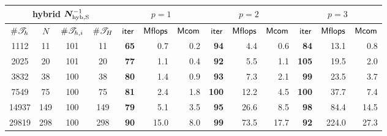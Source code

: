  {\footnotesize
      \tabcolsep 4pt
  \begin{tabular}{cccc|rrr|rrr|rrr}
  \hline
  \multicolumn{4}{c|}{{\small\bf hybrid} $\bm{N}_{\mathrm{hyb,S}}^{-1}$        }  &  \multicolumn{3}{c|}{$p=1$} & \multicolumn{3}{c|}{$p=2$}&   \multicolumn{3}{c}{$p=3$}\\
  \hline
     $ \# {{\mathscr T}_h} $   &
     $ N $ & $ \# {{\mathscr T}_{h,i}} $   &
     $ \# {{\mathscr T}_H} $ & 
     $ \mathsf{iter} $ & $ \mathsf{Mflops} $ & $ \mathsf{Mcom} $ & 
     $ \mathsf{iter} $ & $ \mathsf{Mflops} $ & $ \mathsf{Mcom} $ & 
     $ \mathsf{iter} $ & $ \mathsf{Mflops} $ & $ \mathsf{Mcom} $ \\ 
  \hline
    1112 &       11 &      101 &       11
& {\bf       65}  &        0.7 &        0.2
& {\bf       94}  &        4.4 &        0.6
& {\bf       84}  &       13.1 &        0.8
 \\
    2025 &       20 &      101 &       20
& {\bf       77}  &        1.1 &        0.4
& {\bf       92}  &        5.5 &        1.1
& {\bf      105}  &       19.5 &        2.0
 \\
    3832 &       38 &      100 &       38
& {\bf       80}  &        1.4 &        0.9
& {\bf       93}  &        7.3 &        2.1
& {\bf       99}  &       23.5 &        3.7
 \\
    7549 &       75 &      100 &       75
& {\bf       81}  &        2.4 &        1.8
& {\bf      100}  &       12.2 &        4.5
& {\bf      100}  &       37.7 &        7.4
 \\
   14937 &      149 &      100 &      149
& {\bf       79}  &        5.1 &        3.5
& {\bf       95}  &       26.6 &        8.5
& {\bf       98}  &       84.4 &       14.5
 \\
   29819 &      298 &      100 &      298
& {\bf       90}  &       15.0 &        8.0
& {\bf       99}  &       73.5 &       17.7
& {\bf       92}  &      224.0 &       27.3
 \\
  \hline
  \end{tabular}
 }
